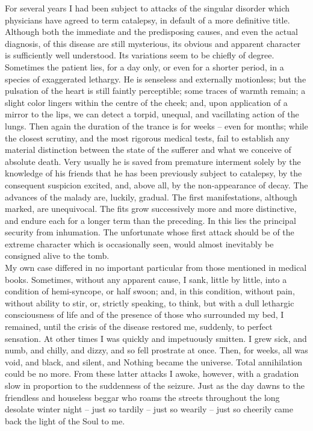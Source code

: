 \documentclass[12pt,a4paper]{article}
\begin{document}
For several years I had been subject to attacks of the singular disorder which physicians have agreed to term catalepsy, in default of a more definitive title. Although both the immediate and the predisposing causes, and even the actual diagnosis, of this disease are still mysterious, its obvious and apparent character is sufficiently well understood. Its variations seem to be chiefly of degree. Sometimes the patient lies, for a day only, or even for a shorter period, in a species of exaggerated lethargy. He is senseless and externally motionless; but the pulsation of the heart is still faintly perceptible; some traces of warmth remain; a slight color lingers within the centre of the cheek; and, upon application of a mirror to the lips, we can detect a torpid, unequal, and vacillating action of the lungs. Then again the duration of the trance is for weeks -- even for months; while the closest scrutiny, and the most rigorous medical tests, fail to establish any material distinction between the state of the sufferer and what we conceive of absolute death. Very usually he is saved from premature interment solely by the knowledge of his friends that he has been previously subject to catalepsy, by the consequent suspicion excited, and, above all, by the non-appearance of decay. The advances of the malady are, luckily, gradual. The first manifestations, although marked, are unequivocal. The fits grow successively more and more distinctive, and endure each for a longer term than the preceding. In this lies the principal security from inhumation. The unfortunate whose first attack should be of the extreme character which is occasionally seen, would almost inevitably be consigned alive to the tomb. \\

My own case differed in no important particular from those mentioned in medical books. Sometimes, without any apparent cause, I sank, little by little, into a condition of hemi-syncope, or half swoon; and, in this condition, without pain, without ability to stir, or, strictly speaking, to think, but with a dull lethargic consciousness of life and of the presence of those who surrounded my bed, I remained, until the crisis of the disease restored me, suddenly, to perfect sensation. At other times I was quickly and impetuously smitten. I grew sick, and numb, and chilly, and dizzy, and so fell prostrate at once. Then, for weeks, all was void, and black, and silent, and Nothing became the universe. Total annihilation could be no more. From these latter attacks I awoke, however, with a gradation slow in proportion to the suddenness of the seizure. Just as the day dawns to the friendless and houseless beggar who roams the streets throughout the long desolate winter night -- just so tardily -- just so wearily -- just so cheerily came back the light of the Soul to me. \\
\end{document}
